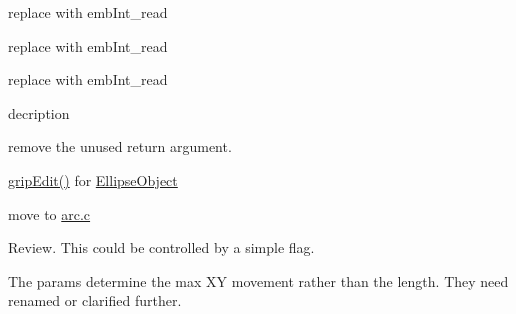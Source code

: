 \begin{DoxyRefList}
%
replace with emb\+Int\+\_\+read  
\item[Member \mbox{\hyperlink{formats_8c_a760e806c16c1612a6b5ca5a26bc736d1}{binary\+Write\+UShort}} (FILE $\ast$f, unsigned short data)]\label{todo__todo000221}%
%
replace with emb\+Int\+\_\+read  
\item[Member \mbox{\hyperlink{formats_8c_ac93ea02c7dfc79fb81e7e7cc5acea14a}{binary\+Write\+UShort\+BE}} (FILE $\ast$f, unsigned short data)]\label{todo__todo000222}%
%
replace with emb\+Int\+\_\+read  
\item[Member \mbox{\hyperlink{main_8c_a5d7bf5f964ae87921bab916b871ea2dd}{copy\+\_\+trim}} (char const $\ast$s)]\label{todo__todo000229}%
%
decription  
\item[Member \mbox{\hyperlink{encoding_8c_a9a4ef6979894437de607ac59967d6691}{decode\+\_\+t01\+\_\+record}} (unsigned char b\mbox{[}3\mbox{]}, int $\ast$x, int $\ast$y, int $\ast$flags)]\label{todo__todo000211}%
%
remove the unused return argument.  
\item[Member \mbox{\hyperlink{class_ellipse_object_af377b9b2e3594940757c25610899c02b}{Ellipse\+Object\+::grip\+Edit}} (const QPointF \&before, const QPointF \&after)]\label{todo__todo000011}%
%
\mbox{\hyperlink{class_ellipse_object_af377b9b2e3594940757c25610899c02b}{grip\+Edit()}} for \mbox{\hyperlink{class_ellipse_object}{Ellipse\+Object}}  
\item[Member \mbox{\hyperlink{main_8c_a16e1e46c5c33874fc9a63476e70c0d66}{emb\+Arc\+\_\+print}} (Emb\+Arc arc)]\label{todo__todo000228}%
%
move to \mbox{\hyperlink{arc_8c}{arc.\+c}}  
\item[Member \mbox{\hyperlink{geometry_8c_ae6461f57f08ce5992c70fa9897988644}{emb\+Geometry\+\_\+vulcanize}} (Emb\+Geometry $\ast$obj)]\label{todo__todo000227}%
%
Review. This could be controlled by a simple flag.  
\item[Member \mbox{\hyperlink{pattern_8c_a6d1fde93564a15d1ec24399fc613d1ac}{emb\+Pattern\+\_\+correct\+For\+Max\+Stitch\+Length}} (Emb\+Pattern $\ast$p, Emb\+Real max\+Stitch\+Length, Emb\+Real max\+Jump\+Length)]\label{todo__todo000230}%
%
The params determine the max XY movement rather than the length. They need renamed or clarified further.  
\item[Member \mbox{\hyperlink{fill_8c_a63bc84e4406e59c092a2e076afedf930}{emb\+Pattern\+\_\+stitch\+Ellipse}} (Emb\+Pattern $\ast$p, Emb\+Ellipse ellipse, int thread\+\_\+index, int style)]\label{todo__todo000213}%

\end{DoxyRefList}
